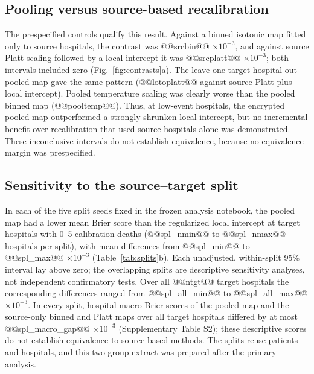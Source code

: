 \documentclass[11pt]{article}
\begin{document}
\subsection*{Pooling versus source-based recalibration}
The prespecified controls qualify this result. Against a binned isotonic map fitted only to source hospitals, the contrast was @@srcbin@@ $\times10^{-3}$, and against source Platt scaling followed by a local intercept it was @@srcplatt@@ $\times10^{-3}$; both intervals included zero (Fig.~\ref{fig:contrasts}a). The leave-one-target-hospital-out pooled map gave the same pattern (@@lotoplatt@@ against source Platt plus local intercept). Pooled temperature scaling was clearly worse than the pooled binned map (@@pooltemp@@). Thus, at low-event hospitals, the encrypted pooled map outperformed a strongly shrunken local intercept, but no incremental benefit over recalibration that used source hospitals alone was demonstrated. These inconclusive intervals do not establish equivalence, because no equivalence margin was prespecified.

\subsection*{Sensitivity to the source--target split}
In each of the five split seeds fixed in the frozen analysis notebook, the pooled map had a lower mean Brier score than the regularized local intercept at target hospitals with 0--5 calibration deaths (@@spl_nmin@@ to @@spl_nmax@@ hospitals per split), with mean differences from @@spl_min@@ to @@spl_max@@ $\times10^{-3}$ (Table~\ref{tab:splits}b). Each unadjusted, within-split 95\% interval lay above zero; the overlapping splits are descriptive sensitivity analyses, not independent confirmatory tests. Over all @@ntgt@@ target hospitals the corresponding differences ranged from @@spl_all_min@@ to @@spl_all_max@@ $\times10^{-3}$. In every split, hospital-macro Brier scores of the pooled map and the source-only binned and Platt maps over all target hospitals differed by at most @@spl_macro_gap@@ $\times10^{-3}$ (Supplementary Table S2); these descriptive scores do not establish equivalence to source-based methods. The splits reuse patients and hospitals, and this two-group extract was prepared after the primary analysis.
\end{document}
